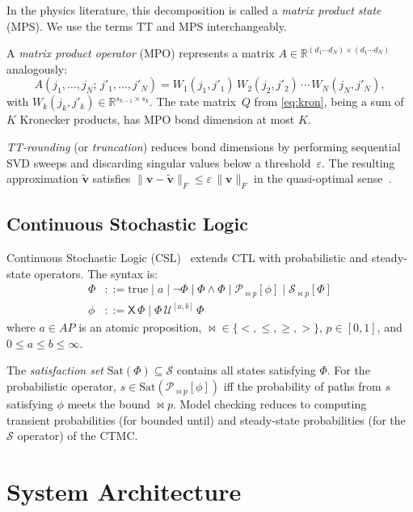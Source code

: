 \documentclass[11pt]{article}
\newcommand{\norm}[1]{\lVert #1 \rVert}
\newcommand{\R}{\mathbb{R}}
\newcommand{\eps}{\varepsilon}
\newcommand{\Sat}{\mathrm{Sat}}
\newcommand{\calS}{\mathcal{S}}
\begin{document}
In the physics literature, this decomposition is called a
\emph{matrix product state} (MPS).
We use the terms TT and MPS interchangeably.

A \emph{matrix product operator} (MPO) represents a matrix
$A \in \R^{(d_1 \cdots d_N) \times (d_1 \cdots d_N)}$ analogously:
\begin{equation}\label{eq:mpo}
  A(j_1,\ldots,j_N;\, j'_1,\ldots,j'_N)
  = W_1(j_1,j'_1)\,W_2(j_2,j'_2)\,\cdots\,W_N(j_N,j'_N),
\end{equation}
with $W_k(j_k,j'_k) \in \R^{s_{k-1} \times s_k}$.
The rate matrix~$Q$ from \eqref{eq:kron}, being a sum of $K$
Kronecker products, has MPO bond dimension at most $K$.

\emph{TT-rounding} (or \emph{truncation}) reduces bond dimensions by
performing sequential SVD sweeps and discarding singular values below
a threshold~$\eps$.
The resulting approximation $\tilde{\mathbf{v}}$ satisfies
$\norm{\mathbf{v} - \tilde{\mathbf{v}}}_F \leq \eps\, \norm{\mathbf{v}}_F$
in the quasi-optimal sense~\cite{oseledets2011}.

\subsection{Continuous Stochastic Logic}\label{sec:bg:csl}

Continuous Stochastic Logic (CSL)~\cite{aziz2000,baier2003} extends
CTL with probabilistic and steady-state operators.
The syntax is:
\begin{align}
  \Phi &::= \text{true} \mid a \mid \neg\Phi \mid \Phi \wedge \Phi
         \mid \mathcal{P}_{\bowtie p}[\phi]
         \mid \mathcal{S}_{\bowtie p}[\Phi] \\
  \phi &::= \mathsf{X}\,\Phi
         \mid \Phi\,\mathcal{U}^{[a,b]}\,\Phi
\end{align}
where $a \in AP$ is an atomic proposition,
${\bowtie} \in \{<, \leq, \geq, >\}$,
$p \in [0,1]$, and $0 \leq a \leq b \leq \infty$.

The \emph{satisfaction set} $\Sat(\Phi) \subseteq \calS$ contains all
states satisfying $\Phi$.
For the probabilistic operator,
$s \in \Sat(\mathcal{P}_{\bowtie p}[\phi])$ iff the probability of
paths from $s$ satisfying $\phi$ meets the bound $\bowtie p$.
Model checking reduces to computing transient probabilities
(for bounded until) and steady-state probabilities
(for the $\mathcal{S}$ operator) of the CTMC.

\section{System Architecture}\label{sec:architecture}
\end{document}

